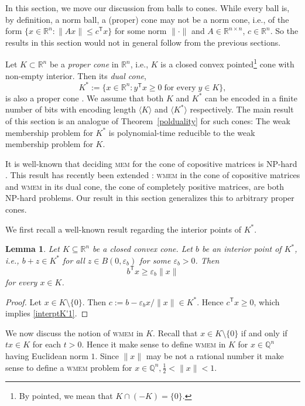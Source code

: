 \documentclass[11pt,reqno]{amsart}
\newtheorem{lemma}[theorem]{Lemma}
\theoremstyle{definition}
\theoremstyle{remark}
\begin{document}
In this section, we move our discussion from balls to cones. While every ball is, by definition, a norm ball, a (proper) cone may not be a norm cone, 
i.e., of the form $\{ x\in \mathbb{R}^n : \| Ax \| \le c^\mathsf{T}x \}$ for some norm $\|\cdot\|$ and $A \in \mathbb{R}^{n \times n}$, $c \in \mathbb{R}^n$.  
So the results in this section would not in general follow from the previous sections.

Let $K\subset \mathbb{R}^n$ be a \emph{proper cone} in $\mathbb{R}^n$, i.e., $K$ is a closed convex pointed\footnote{By pointed, we mean that 
$K \cap (-K)=\{0\} $.} cone with non-empty interior. Then its \emph{dual cone},
\[
K^*:=\{x\in\mathbb{R}^n : y^\mathsf{T} x\ge 0 \;\text{for every}\; y\in K\},
\]
is also a proper cone \cite{Roc}. We assume that both $K$ and $K^*$ can be encoded in a finite number of bits with encoding length $\langle K \rangle$ and $\langle K^* \rangle$ respectively. The main result of this section is an analogue of Theorem~\ref{polduality} for such cones: The weak membership problem for $K^*$ is polynomial-time reducible to the weak membership problem for $K$.

It is well-known that deciding \textsc{mem} for the cone of copositive matrices is NP-hard \cite{MK87}. This result  has recently been  extended \cite{DG14}: \textsc{wmem} in the cone of copositive matrices and \textsc{wmem} in its dual cone, the cone of completely positive matrices, are both NP-hard problems. Our result in this section generalizes this to arbitrary proper cones.

We first recall a well-known result regarding the interior points of $K^*$.
\begin{lemma}\label{interptK'}  Let $K\subseteq \mathbb{R}^n$ be a closed convex cone.  Let $b$ be an interior point of $K^*$, i.e., 
$b+z\in K^*$ for all $z\in B(0,\varepsilon_b)$ for some $\varepsilon_b >0$.  Then
\begin{equation} \label{interptK'1}  
b^\mathsf{T} x\ge \varepsilon_b \|x\|
\end{equation}
for every $x\in K$.
\end{lemma}
\begin{proof}  Let $x\in K\setminus\{0\}$.  Then $c:=b- \varepsilon_b x/ \|x\|\in K^*$.  Hence $c^\mathsf{T} x\ge 0$, which implies \eqref{interptK'1}.
\end{proof}

We now discuss the notion of \textsc{wmem} in $K$.  Recall that $x\in K\setminus\{0\}$ if and only if $tx\in K$ for each $t>0$.  Hence it make sense to define \textsc{wmem} in $K$ for $x\in \mathbb{Q}^n$
having Euclidean norm $1$.  Since $\|x\|$ may be not a rational number it make sense to define a \textsc{wmem} problem for $x\in \mathbb{Q}^n, \frac{1}{2} <\|x\|<1$.
 
\end{document}
